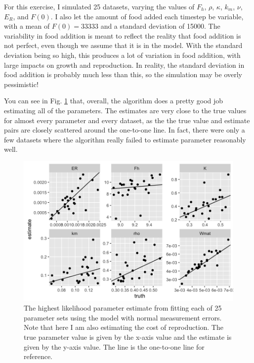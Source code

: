 \documentclass[12pt,reqno,final,pdftex]{amsart}\usepackage[]{graphicx}\usepackage[]{color}
\newenvironment{knitrout}{}{} %
\theoremstyle{plain}
\numberwithin{equation}{part}
\begin{document}
For this exercise, I simulated 25 datasets, varying the values of $F_h$, $\rho$, $\kappa$, $k_m$, $\nu$, $E_R$, and $F(0)$.
I also let the amount of food added each timestep be variable, with a mean of $F(0)=33333$ and a standard deviation of 15000.
The variability in food addition is meant to reflect the reality that food addition is not perfect, even though we assume that it is in the model.
With the standard deviation being so high, this produces a lot of variation in food addition, with large impacts on growth and reproduction.
In reality, the standard deviation in food addition is probably much less than this, so the simulation may be overly pessimistic!

You can see in Fig. \ref{fig:rep-cost-est-2} that, overall, the algorithm does a pretty good job estimating all of the parameters.
The estimates are very close to the true values for almost every parameter and every dataset, as the the true value and estimate pairs are closely scattered around the one-to-one line.
In fact, there were only a few datasets where the algorithm really failed to estimate parameter reasonably well.

\begin{knitrout}\scriptsize
{}\color{fgcolor}\begin{figure}

\includegraphics[width=\linewidth]{figure/rep-cost-est-2-1} \hfill{}

\caption[The highest likelihood parameter estimate from fitting each of 25 parameter sets using the model with normal measurement errors]{The highest likelihood parameter estimate from fitting each of 25 parameter sets using the model with normal measurement errors. Note that here I am also estimating the cost of reproduction. The true parameter value is given by the x-axis value and the estimate is given by the y-axis value. The line is the one-to-one line for reference.}\label{fig:rep-cost-est-2}
\end{figure}


\end{knitrout}
\end{document}
